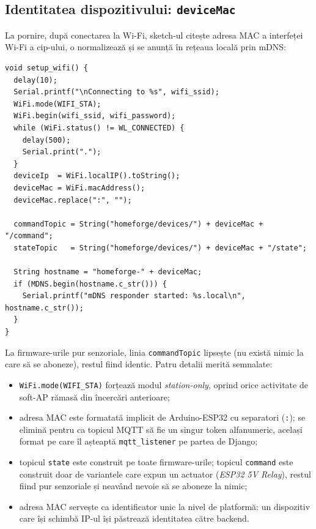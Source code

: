 \subsection{Identitatea dispozitivului: \texttt{deviceMac}}
La pornire, după conectarea la Wi-Fi, sketch-ul citește adresa MAC a interfeței Wi-Fi a cip-ului, o normalizează și se anunță în rețeaua locală prin mDNS:
\begin{verbatim}
void setup_wifi() {
  delay(10);
  Serial.printf("\nConnecting to %s", wifi_ssid);
  WiFi.mode(WIFI_STA);
  WiFi.begin(wifi_ssid, wifi_password);
  while (WiFi.status() != WL_CONNECTED) {
    delay(500);
    Serial.print(".");
  }
  deviceIp  = WiFi.localIP().toString();
  deviceMac = WiFi.macAddress();
  deviceMac.replace(":", "");

  commandTopic = String("homeforge/devices/") + deviceMac + "/command";
  stateTopic   = String("homeforge/devices/") + deviceMac + "/state";

  String hostname = "homeforge-" + deviceMac;
  if (MDNS.begin(hostname.c_str())) {
    Serial.printf("mDNS responder started: %s.local\n", hostname.c_str());
  }
}
\end{verbatim}
La firmware-urile pur senzoriale, linia \texttt{commandTopic} lipsește (nu există nimic la care să se aboneze), restul fiind identic.
Patru detalii merită semnalate:
\begin{itemize}
    \item \texttt{WiFi.mode(WIFI\_STA)} forțează modul \emph{station-only}, oprind orice activitate de soft-AP rămasă din încercări anterioare;
    \item adresa MAC este formatată implicit de Arduino-ESP32 cu separatori (\texttt{:}); se elimină pentru ca topicul MQTT să fie un singur token alfanumeric, același format pe care îl așteaptă \texttt{mqtt\_listener} pe partea de Django;
    \item topicul \texttt{state} este construit pe toate firmware-urile; topicul \texttt{command} este construit doar de variantele care expun un actuator (\emph{ESP32 5V Relay}), restul fiind pur senzoriale și neavând nevoie să se aboneze la nimic;
    \item adresa MAC servește ca identificator unic la nivel de platformă: un dispozitiv care își schimbă IP-ul își păstrează identitatea către backend.
\end{itemize}

